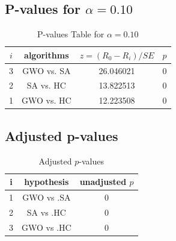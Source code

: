 \documentclass[a4paper,10pt]{article}
\begin{document}
\begin{landscape}
\subsection{P-values for $\alpha=0.10$}

\begin{table}[!htp]
\centering\scriptsize
\begin{tabular}{cccc}
$i$&algorithms&$z=(R_0 - R_i)/SE$&$p$\\
\hline3&GWO vs. SA&26.046021&0\\
2&SA vs. HC&13.822513&0\\
1&GWO vs. HC&12.223508&0\\
\hline
\end{tabular}
\caption{P-values Table for $\alpha=0.10$}
\end{table}\pagebreak

\subsection{Adjusted p-values}

\begin{table}[!htp]
\centering\scriptsize
\begin{tabular}{ccc}
i&hypothesis&unadjusted $p$\\
\hline1&GWO vs .SA&0\\
2&SA vs .HC&0\\
3&GWO vs .HC&0\\
\hline
\end{tabular}
\caption{Adjusted $p$-values}
\end{table}

\end{landscape}
\end{document}
